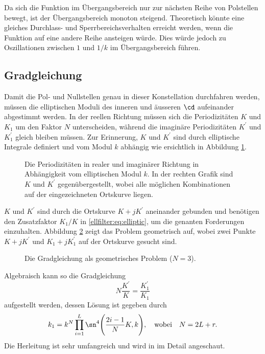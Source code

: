 Da sich die Funktion im Übergangsbereich nur zur nächsten Reihe von Polstellen bewegt, ist der Übergangsbereich monoton steigend.
Theoretisch könnte eine gleiches Durchlass- und Sperrbereichsverhalten erreicht werden, wenn die Funktion auf eine andere Reihe ansteigen würde.
Dies würde jedoch zu Oszillationen zwischen $1$ und $1/k$ im Übergangsbereich führen.

\subsection{Gradgleichung}

Damit die Pol- und Nullstellen genau in dieser Konstellation durchfahren werden, müssen die elliptischen Moduli des inneren und äusseren $\cd$ aufeinander abgestimmt werden.
In der reellen Richtung müssen sich die Periodizitäten $K$ und $K_1$ um den Faktor $N$ unterscheiden, während die imaginäre Periodizitäten $K^\prime$ und $K^\prime_1$ gleich bleiben müssen.
Zur Erinnerung, $K$ und $K^\prime$ sind durch elliptische Integrale definiert und vom Modul $k$ abhängig wie ersichtlich in Abbildung \ref{ellfilter:fig:kprime}.
\begin{figure}
    \centering
    
    \caption{
        Die Periodizitäten in realer und imaginärer Richtung in Abhängigkeit vom elliptischen Modul $k$.
        In der rechten Grafik sind $K$ und $K^\prime$ gegenübergestellt, wobei alle möglichen Kombinationen auf der eingezeichneten Ortskurve liegen.
    }
    \label{ellfilter:fig:kprime}
\end{figure}
$K$ und $K^\prime$ sind durch die Ortskurve $K + jK^\prime$ aneinander gebunden und benötigen den Zusatzfaktor $K_1/K$ in \eqref{ellfilter:eq:elliptic}, um die genanten Forderungen einzuhalten.
Abbildung \ref{ellfilter:fig:degree_eq} zeigt das Problem geometrisch auf, wobei zwei Punkte $K+jK^\prime$ und $K_1+jK_1^\prime$ auf der Ortskurve gesucht sind.
\begin{figure}
    \centering
    
    \caption{Die Gradgleichung als geometrisches Problem ($N=3$).}
    \label{ellfilter:fig:degree_eq}
\end{figure}
Algebraisch kann so die Gradgleichung
\begin{equation}
    N \frac{K^\prime}{K} = \frac{K^\prime_1}{K_1}
\end{equation}
aufgestellt werden, dessen Lösung ist gegeben durch
\begin{equation}\label{ellfilter:eq:degeqsol}
k_1 = k^N \prod_{i=1}^L \sn^4 \Bigg( \frac{2i - 1}{N} K, k \Bigg),
\quad \text{wobei} \quad
N = 2L+r.
\end{equation}
Die Herleitung ist sehr umfangreich und wird in \cite{ellfilter:bib:orfanidis} im Detail angeschaut.

